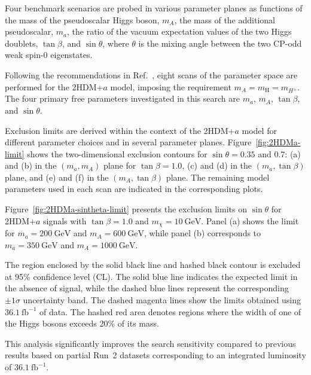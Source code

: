 Four benchmark scenarios are probed in various parameter planes as functions of the mass of the pseudoscalar Higgs boson, $m_A$, the mass of the additional pseudoscalar, $m_a$, the ratio of the vacuum expectation values of the two Higgs doublets, $\tan\beta$, and $\sin\theta$, where $\theta$ is the mixing angle between the two CP-odd weak spin-0 eigenstates. 

Following the recommendations in Ref.~\cite{Abe:2018emu}, eight scans of the parameter space are performed for the 2HDM+$a$ model, imposing the requirement $m_A = m_{\text{H}} = m_{H^\pm}$. 
The four primary free parameters investigated in this search are $m_a$, $m_A$, $\tan\beta$, and $\sin\theta$.

Exclusion limits are derived within the context of the 2HDM+$a$ model for different parameter choices and in several parameter planes. 
Figure~\ref{fig:2HDMa-limit} shows the two-dimensional exclusion contours for $\sin\theta = 0.35$ and 0.7: 
(a) and (b) in the $(m_a, m_A)$ plane for $\tan\beta = 1.0$, 
(c) and (d) in the $(m_a, \tan\beta)$ plane, and 
(e) and (f) in the $(m_A, \tan\beta)$ plane. 
The remaining model parameters used in each scan are indicated in the corresponding plots. 

Figure~\ref{fig:2HDMa-sintheta-limit} presents the exclusion limits on $\sin\theta$ for 2HDM+$a$ signals with $\tan\beta = 1.0$ and $m_\chi = 10~\text{GeV}$. 
Panel (a) shows the limit for $m_a = 200~\text{GeV}$ and $m_A = 600~\text{GeV}$, while panel (b) corresponds to $m_a = 350~\text{GeV}$ and $m_A = 1000~\text{GeV}$.

The region enclosed by the solid black line and hashed black contour is excluded at 95\% confidence level (CL). 
The solid blue line indicates the expected limit in the absence of signal, while the dashed blue lines represent the corresponding $\pm1\sigma$ uncertainty band. 
The dashed magenta lines show the limits obtained using $36.1~\text{fb}^{-1}$ of data. 
The hashed red area denotes regions where the width of one of the Higgs bosons exceeds 20\% of its mass.

This analysis significantly improves the search sensitivity compared to previous results based on partial Run~2 datasets corresponding to an integrated luminosity of $36.1~\text{fb}^{-1}$.

